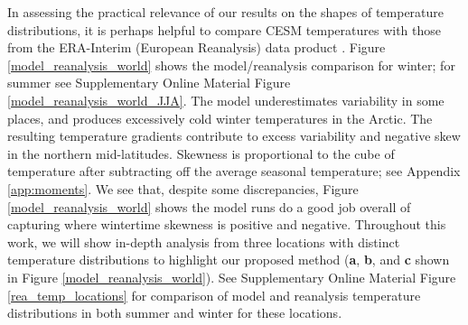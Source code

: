 \documentclass{ametsoc}
\begin{document}
{ In assessing the practical relevance of our results on the shapes of temperature distributions, it is perhaps helpful} to compare CESM temperatures with those from the ERA-Interim (European Reanalysis) data product \citep{dee2011era}. Figure \ref{model_reanalysis_world} shows the model/reanalysis comparison for winter; for summer see Supplementary Online Material Figure \ref{model_reanalysis_world_JJA}. The model underestimates variability in some places, and produces excessively cold winter temperatures in the Arctic. The resulting temperature gradients contribute to excess variability and negative skew in the northern mid-latitudes.
Skewness is proportional to the cube of temperature after subtracting off the average seasonal temperature; see Appendix \ref{app:moments}. 
{We see that, despite some discrepancies, Figure  \ref{model_reanalysis_world} shows the model runs do a good job overall of capturing where wintertime skewness is positive and negative.}
Throughout this work, we will show in-depth analysis from three locations with distinct temperature distributions to highlight our proposed method (\textbf{a}, \textbf{b}, and \textbf{c} shown in Figure \ref{model_reanalysis_world}). See Supplementary Online Material Figure \ref{rea_temp_locations} for comparison of model and reanalysis temperature distributions in both summer and winter for these locations. 
 
\end{document}
